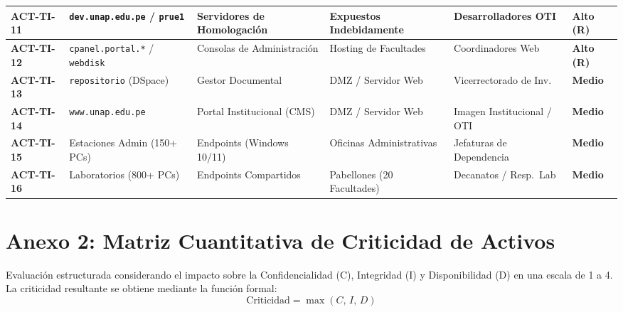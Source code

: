 \begin{center}
\begin{longtable}{>{\bfseries}p{1.6cm} p{3.2cm} p{2.7cm} p{2.5cm} p{2.6cm} >{\centering\arraybackslash}p{1.4cm}}
\midrule
ACT-TI-11 & \texttt{dev.\allowbreak unap.\allowbreak edu.pe} / \texttt{prue1} & Servidores de Homologación & Expuestos Indebidamente & Desarrolladores OTI & \textbf{Alto (R)} \\
\midrule
ACT-TI-12 & \texttt{cpanel.portal.*} / \texttt{webdisk} & Consolas de Administración & Hosting de Facultades & Coordinadores Web & \textbf{Alto (R)} \\
\midrule
ACT-TI-13 & \texttt{repositorio} (DSpace) & Gestor Documental & DMZ / Servidor Web & Vicerrectorado de Inv. & \textbf{Medio} \\
\midrule
ACT-TI-14 & \texttt{www.\allowbreak unap.\allowbreak edu.pe} & Portal Institucional (CMS) & DMZ / Servidor Web & Imagen Institucional / OTI & \textbf{Medio} \\
\midrule
ACT-TI-15 & Estaciones Admin (150+ PCs) & Endpoints (Windows 10/11) & Oficinas Administrativas & Jefaturas de Dependencia & \textbf{Medio} \\
\midrule
ACT-TI-16 & Laboratorios (800+ PCs) & Endpoints Compartidos & Pabellones (20 Facultades) & Decanatos / Resp.\ Lab & \textbf{Medio} \\
\bottomrule
\end{longtable}
\end{center}

\newpage
\section*{Anexo 2: Matriz Cuantitativa de Criticidad de Activos}

Evaluación estructurada considerando el impacto sobre la Confidencialidad (C), Integridad (I) y Disponibilidad (D) en una escala de 1 a 4. La criticidad resultante se obtiene mediante la función formal:
\[
\text{Criticidad} = \max(C,\, I,\, D)
\]

